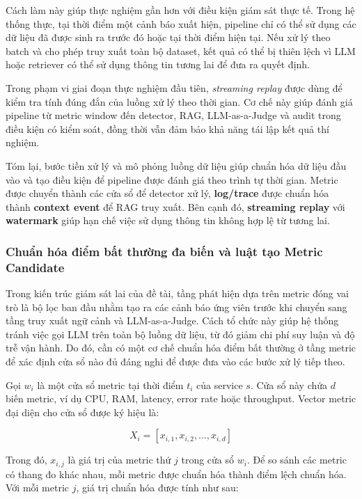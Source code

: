Cách làm này giúp thực nghiệm gần hơn với điều kiện giám sát thực tế. Trong hệ thống thực, tại thời điểm một cảnh báo xuất hiện, pipeline chỉ có thể sử dụng các dữ liệu đã được sinh ra trước đó hoặc tại thời điểm hiện tại. Nếu xử lý theo batch và cho phép truy xuất toàn bộ dataset, kết quả có thể bị thiên lệch vì LLM hoặc retriever có thể sử dụng thông tin tương lai để đưa ra quyết định.

Trong phạm vi giai đoạn thực nghiệm đầu tiên, \textit{streaming replay} được dùng để kiểm tra tính đúng đắn của luồng xử lý theo thời gian. Cơ chế này giúp đánh giá pipeline từ metric window đến detector, RAG, LLM-as-a-Judge và audit trong điều kiện có kiểm soát, đồng thời vẫn đảm bảo khả năng tái lập kết quả thí nghiệm.

Tóm lại, bước tiền xử lý và mô phỏng luồng dữ liệu giúp chuẩn hóa dữ liệu đầu vào và tạo điều kiện để pipeline được đánh giá theo trình tự thời gian. Metric được chuyển thành các cửa sổ để detector xử lý, \textbf{log/trace} được chuẩn hóa thành \textbf{context event} để RAG truy xuất. Bên cạnh đó, \textbf{streaming replay} với \textbf{watermark} giúp hạn chế việc sử dụng thông tin không hợp lệ từ tương lai.

\subsubsection{Chuẩn hóa điểm bất thường đa biến và luật tạo Metric Candidate}

Trong kiến trúc giám sát lai của đề tài, tầng phát hiện dựa trên metric đóng vai trò là bộ lọc ban đầu nhằm tạo ra các cảnh báo ứng viên trước khi chuyển sang tầng truy xuất ngữ cảnh và LLM-as-a-Judge. Cách tổ chức này giúp hệ thống tránh việc gọi LLM trên toàn bộ luồng dữ liệu, từ đó giảm chi phí suy luận và độ trễ vận hành. Do đó, cần có một cơ chế chuẩn hóa điểm bất thường ở tầng metric để xác định cửa sổ nào đủ đáng nghi để được đưa vào các bước xử lý tiếp theo.

Gọi \(w_i\) là một cửa sổ metric tại thời điểm \(t_i\) của service \(s\). Cửa sổ này chứa \(d\) biến metric, ví dụ CPU, RAM, latency, error rate hoặc throughput. Vector metric đại diện cho cửa sổ được ký hiệu là:

\[
X_i = [x_{i,1}, x_{i,2}, \ldots, x_{i,d}]
\]

Trong đó, \(x_{i,j}\) là giá trị của metric thứ \(j\) trong cửa sổ \(w_i\). Để so sánh các metric có thang đo khác nhau, mỗi metric được chuẩn hóa thành điểm lệch chuẩn hóa. Với mỗi metric \(j\), giá trị chuẩn hóa được tính như sau:

